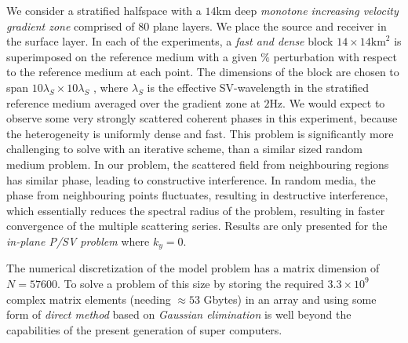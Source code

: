 We consider a stratified halfspace with a $14$km deep {\em monotone 
increasing velocity gradient zone\/} comprised of $80$ plane layers. We 
place the source and receiver in the surface layer. In each of the 
experiments, a {\em fast and dense\/} block $14 \times 14 \mbox{km}^2$ is 
superimposed on the reference medium with a given $\%$ perturbation with 
respect to the reference medium at each point. The dimensions of the block 
are chosen to span $10 \lambda_S \times 10 \lambda_S$ , where $\lambda_S$ 
is the effective SV-wavelength in the stratified reference medium averaged 
over the gradient zone at $2$Hz. We would expect to observe some very 
strongly scattered coherent phases in this experiment, because the 
heterogeneity is uniformly dense and fast. This problem is significantly 
more challenging to solve with an iterative scheme, than a similar sized 
random medium problem. In our problem, the scattered field from 
neighbouring 
regions has similar phase, leading to constructive interference. In 
random media, the phase from neighbouring points fluctuates, resulting in 
destructive interference, which essentially reduces the spectral radius 
of the problem, resulting in faster convergence of the multiple 
scattering series.  Results are only presented for the {\em in-plane P/SV 
problem\/} where $k_y=0$.

The numerical discretization  of the model problem has a matrix dimension 
of $N=57600$. To solve a 
problem of this size by storing the required $3.3 \times 10^{9}$ complex 
matrix 
elements (needing $\approx 53$ Gbytes) in an array and using some form of 
{\em direct method\/} based on 
{\em Gaussian elimination\/} is well beyond the capabilities of the 
present 
generation of super computers. 


